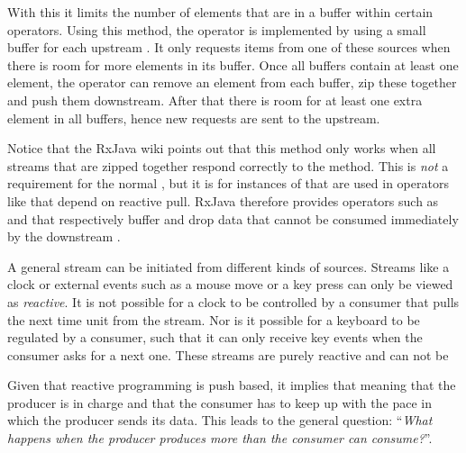 With this it limits the number of elements that are in a buffer within certain operators. Using this method, the  operator is implemented by using a small buffer for each upstream \obs. It only requests items from one of these sources when there is room for more elements in its buffer. Once all buffers contain at least one element, the operator can remove an element from each buffer, zip these together and push them downstream. After that there is room for at least one extra element in all buffers, hence new requests are sent to the upstream.

Notice that the RxJava wiki  points out that this method only works when all streams that are zipped together respond correctly to the  method. This is \emph{not} a requirement for the normal \obs, but it is for instances of \obs that are used in operators like  that depend on reactive pull. RxJava therefore provides operators such as  and  that respectively buffer and drop data that cannot be consumed immediately by the downstream \obv.



















\HRule


A general stream can be initiated from different kinds of sources. Streams like a clock or external events such as a mouse move or a key press can only be viewed as \emph{reactive}. It is not possible for a clock to be controlled by a consumer that pulls the next time unit from the stream. Nor is it possible for a keyboard to be regulated by a consumer, such that it can only receive key events when the consumer asks for a next one. These streams are purely reactive and can not be 

Given that reactive programming is push based, it implies that meaning that the producer is in charge and that the consumer has to keep up with the pace in which the producer sends its data. This leads to the general question: ``\emph{What happens when the producer produces more than the consumer can consume?}''. 
